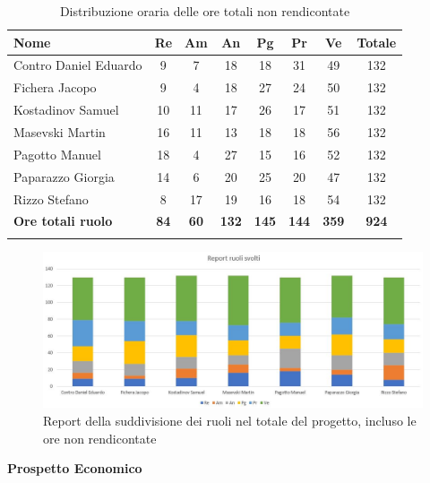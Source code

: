 \documentclass[../piano_di_progetto.tex]{subfiles}
\begin{document}
\begin{center}
	\begin{longtable}{|l|c|c|c|c|c|c|c|}
		\hline
		\rowcolor{lightgray}
		\textbf{Nome} & \textbf{Re} & \textbf{Am} & \textbf{An} & \textbf{Pg}  & \textbf{Pr}   & \textbf{Ve} & \textbf{Totale} \\

		\hline
			Contro Daniel Eduardo & 9 & 7 & 18 & 18 & 31 & 49 & 132 \\
			Fichera Jacopo & 9 & 4 & 18 & 27 & 24 & 50 & 132 \\
			Kostadinov Samuel & 10 & 11 & 17 & 26 & 17 & 51 & 132 \\
			Masevski Martin & 16 & 11 & 13 & 18 & 18 & 56 & 132 \\
			Pagotto Manuel & 18 & 4 & 27 & 15 & 16 & 52 & 132 \\			
			Paparazzo Giorgia & 14 & 6 & 20 & 25 & 20 & 47 & 132 \\
			Rizzo Stefano & 8 & 17 & 19 & 16 & 18 & 54 & 132 \\
			\hline
			\textbf{Ore totali ruolo} & \textbf{84} & \textbf{60} & \textbf{132} & \textbf{145} & \textbf{144} & \textbf{359} & \textbf{924} \\
		\hline	
		\rowcolor{white}
		\caption{Distribuzione oraria delle ore totali non rendicontate}
	\end{longtable}
\end{center}

\begin{figure}[H]
\centering
\includegraphics[width=12cm]{src/img/report/report_ruoli_tot}
\caption{Report della suddivisione dei ruoli nel totale del progetto, incluso le ore non rendicontate}
\end{figure}

\clearpage

\textbf{Prospetto Economico}
\end{document}
